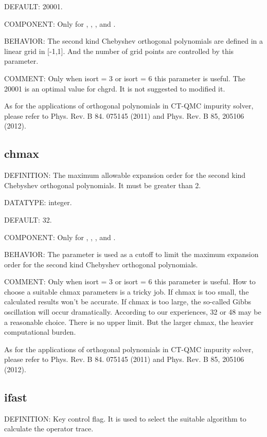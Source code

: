 {\color{blue}DEFAULT:} 20001.

{\color{brown}COMPONENT:} Only for {\gardenia}, {\narcissus}, {\lavender}, and {\manjushaka}.

{\color{purple}BEHAVIOR:} The second kind Chebyshev orthogonal polynomials are defined in a linear grid in [-1,1]. And the number of grid points are controlled by this parameter.

{\color{olive}COMMENT:} Only when isort = 3 or isort = 6 this parameter is useful. The 20001 is an optimal value for chgrd. It is not suggested to modified it. 

As for the applications of orthogonal polynomials in CT-QMC impurity solver, please refer to Phys. Rev. B 84. 075145 (2011) and Phys. Rev. B 85, 205106 (2012). 

\subsection{chmax}
{\color{red}DEFINITION:} The maximum allowable expansion order for the second kind Chebyshev orthogonal polynomials. It must be greater than 2.

{\color{green}DATATYPE:} integer.

{\color{blue}DEFAULT:} 32.

{\color{brown}COMPONENT:} Only for {\gardenia}, {\narcissus}, {\lavender}, and {\manjushaka}.

{\color{purple}BEHAVIOR:} The parameter is used as a cutoff to limit the maximum expansion order for the second kind Chebyshev orthogonal polynomials.

{\color{olive}COMMENT:} Only when isort = 3 or isort = 6 this parameter is useful. How to choose a suitable chmax parameters is a tricky job. If chmax is too small, the calculated results won't be accurate. If chmax is too large, the so-called Gibbs oscillation will occur dramatically. According to our experiences, 32 or 48 may be a reasonable choice. There is no upper limit. But the larger chmax, the heavier computational burden. 

As for the applications of orthogonal polynomials in CT-QMC impurity solver, please refer to Phys. Rev. B 84. 075145 (2011) and Phys. Rev. B 85, 205106 (2012).

\subsection{ifast}
{\color{red}DEFINITION:} Key control flag. It is used to select the suitable algorithm to calculate the operator trace. 

